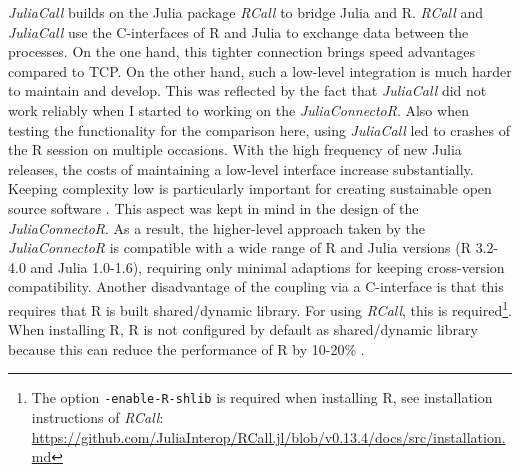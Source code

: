 \documentclass[12pt]{article}
\newcommand{\inlinecode}[1]{\texttt{#1}}
\newcommand{\apkg}[1]{\emph{#1}}
\begin{document}
\apkg{JuliaCall} builds on the Julia package \apkg{RCall} \citep{rcallGithub} to bridge Julia and R.
\apkg{RCall} and \apkg{JuliaCall} use the C-interfaces of R and Julia to exchange data between the processes.
On the one hand, this tighter connection brings speed advantages compared to TCP.
On the other hand, such a low-level integration is much harder to maintain and develop.
This was reflected by the fact that \apkg{JuliaCall} did not work reliably when I started to working on the \apkg{JuliaConnectoR}.
Also when testing the functionality for the comparison here, using \apkg{JuliaCall} led to crashes of the R session on multiple occasions.
With the high frequency of new Julia releases, the costs of maintaining a low-level interface increase substantially.
Keeping complexity low is particularly important for creating sustainable open source software \citep{midha_improving_2010}.
This aspect was kept in mind in the design of the \apkg{JuliaConnectoR}.
As a result, the higher-level approach taken by the \apkg{JuliaConnectoR} is compatible with a wide range of R and Julia versions (R 3.2-4.0 and Julia 1.0-1.6), requiring only minimal adaptions for keeping cross-version compatibility.
Another disadvantage of the coupling via a C-interface is that this requires that R is built shared/dynamic library.
For using \apkg{RCall}, this is required\footnote{The option \inlinecode{-enable-R-shlib} is required when installing R, see installation instructions of \apkg{RCall}: \url{https://github.com/JuliaInterop/RCall.jl/blob/v0.13.4/docs/src/installation.md}}.
When installing R, R is not configured by default as shared/dynamic library because this can reduce the performance of R by 10-20\% \citep{rAdmin}.
\end{document}
